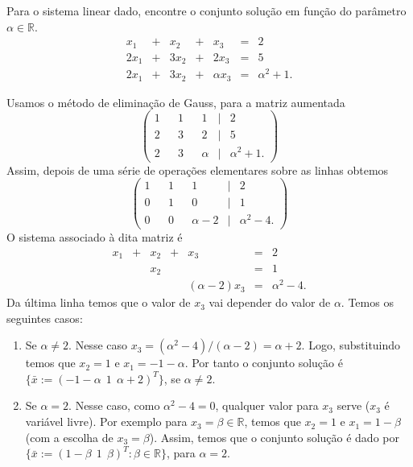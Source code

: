 \documentclass[11pt]{exam}
\begin{document}
\begin{questions}
  \question[20]
  Para o sistema linear dado, encontre o conjunto solução 
  em função do parâmetro $\alpha \in \mathbb{R}$. 
       $$
       \begin{matrix}
       x_1&+&x_2&+&x_3&=&2\\
       2x_1&+&3x_2&+&2x_3&=&5\\
       2x_1&+&3x_2&+&\alpha x_3&=&\alpha^{2}+1.
       \end{matrix}
       $$
     \begin{solution}
     Usamos o método de eliminação de Gauss, para a matriz aumentada 
     $$
       \begin{pmatrix}
       1& &1& &1&|&2\\
       2& &3& &2&|&5\\
       2& &3& &\alpha&|&\alpha^{2}+1.
       \end{pmatrix}
       $$
       Assim, depois de uma série de operações elementares sobre as linhas obtemos 
        $$
       \begin{pmatrix}
       1& &1& &1&|&2\\
       0& &1& &0&|&1\\
       0& &0& &\alpha-2&|&\alpha^{2}-4.
       \end{pmatrix}
       $$
       O sistema associado à dita matriz é 
        $$
       \begin{matrix}
       x_1&+&x_2&+&x_3&=&2\\
          & &x_2& &   &=&1\\
          & &   & &(\alpha-2)x_3&=&\alpha^{2}-4.
       \end{matrix}
       $$
       Da última linha temos que o valor de $x_3$ vai depender do valor de $\alpha$. Temos os seguintes casos:
        \begin{enumerate}
        \item Se $\alpha\neq2$. Nesse caso $x_3=(\alpha^{2}-4)/(\alpha-2)=\alpha+2$. Logo, substituindo temos que $x_{2}=1$ e $x_1=-1-\alpha$. Por tanto o conjunto solução é $\{\bar{x}:=(-1-\alpha \ \ 1 \ \ \alpha+2)^{T}\}$, se $\alpha\neq2$.
        \item Se $\alpha=2$. Nesse caso, como $\alpha^{2}-4=0$, 
        qualquer valor para $x_{3}$ serve ($x_3$ é variável livre). Por exemplo para $x_3=\beta \in \mathbb{R}$, temos que 
        $x_2=1$ e $x_{1}=1-\beta$ (com a escolha de $x_{3}=\beta$). Assim,  temos que o conjunto solução é dado por 
        $\{\bar{x}:=(1-\beta \ \ 1 \ \ \beta)^{T}: \beta \in \mathbb{R}\}$, 
        para $\alpha=2$.
        \end{enumerate}
     \end{solution}
  \question
  \begin{parts}

\end{parts}
\end{questions}
\end{document}
